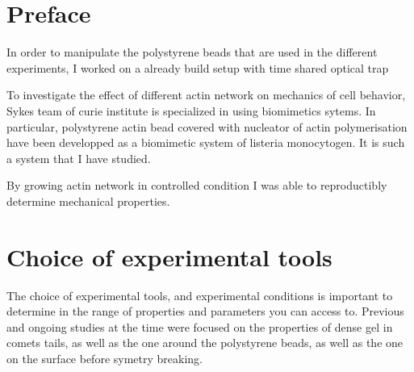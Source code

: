 \documentclass[A4paperpaper,11pt,english]{sphinxmanual}
\begin{document}
\section{Preface}
\label{parts/physicalparameters:preface}
In order to manipulate the polystyrene beads that are used in the different
experiments, I worked on a already build setup with time shared optical trap

To investigate the effect of different actin network on mechanics of cell
behavior, Sykes team of curie institute is specialized in using biomimetics
sytems. In particular, polystyrene actin bead covered with nucleator of actin
polymerisation have been developped as a biomimetic system of listeria
monocytogen. It is such a system that I have studied.

By growing actin network in controlled condition I was able to reproductibly
determine mechanical properties.


\section{Choice of experimental tools}
\label{parts/physicalparameters:choice-of-experimental-tools}
The choice of experimental tools, and experimental conditions is important to
determine in the range of properties and parameters you can access to.
Previous and ongoing studies at the time were focused on the properties of dense
gel in comets tails, as well as the one around the polystyrene beads, as well as the one on the surface before symetry breaking.
\end{document}

